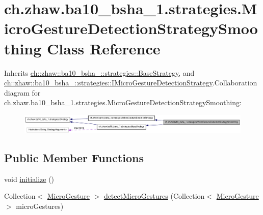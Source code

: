 \hypertarget{classch_1_1zhaw_1_1ba10__bsha__1_1_1strategies_1_1MicroGestureDetectionStrategySmoothing}{
\section{ch.zhaw.ba10\_\-bsha\_\-1.strategies.MicroGestureDetectionStrategySmoothing Class Reference}
\label{classch_1_1zhaw_1_1ba10__bsha__1_1_1strategies_1_1MicroGestureDetectionStrategySmoothing}
}


Inherits \hyperlink{classch_1_1zhaw_1_1ba10__bsha__1_1_1strategies_1_1BaseStrategy}{ch::zhaw::ba10\_\-bsha\_::strategies::BaseStrategy}, and \hyperlink{interfacech_1_1zhaw_1_1ba10__bsha__1_1_1strategies_1_1IMicroGestureDetectionStrategy}{ch::zhaw::ba10\_\-bsha\_::strategies::IMicroGestureDetectionStrategy}.Collaboration diagram for ch.zhaw.ba10\_\-bsha\_\-1.strategies.MicroGestureDetectionStrategySmoothing:\nopagebreak
\begin{figure}[H]
\begin{center}
\leavevmode
\includegraphics[width=400pt]{classch_1_1zhaw_1_1ba10__bsha__1_1_1strategies_1_1MicroGestureDetectionStrategySmoothing__coll__graph}
\end{center}
\end{figure}
\subsection*{Public Member Functions}
\begin{DoxyCompactItemize}
\item 
void \hyperlink{classch_1_1zhaw_1_1ba10__bsha__1_1_1strategies_1_1MicroGestureDetectionStrategySmoothing_aac1ded82cadaac7e6f16e20a7db04190}{initialize} ()
\item 
Collection$<$ \hyperlink{classch_1_1zhaw_1_1ba10__bsha__1_1_1service_1_1MicroGesture}{MicroGesture} $>$ \hyperlink{classch_1_1zhaw_1_1ba10__bsha__1_1_1strategies_1_1MicroGestureDetectionStrategySmoothing_acdb5b6b2bb7ad9f48c79b88770113f45}{detectMicroGestures} (Collection$<$ \hyperlink{classch_1_1zhaw_1_1ba10__bsha__1_1_1service_1_1MicroGesture}{MicroGesture} $>$ microGestures)
\end{DoxyCompactItemize}
